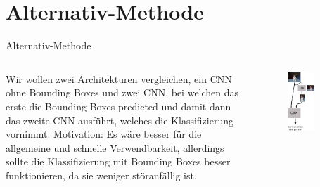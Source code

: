   \section{Alternativ-Methode}
  \begin{frame}{Alternativ-Methode}
    \begin{columns}[c]
      Wir wollen zwei Architekturen vergleichen, ein CNN ohne Bounding Boxes und zwei
      CNN, bei welchen das erste die Bounding Boxes predicted und damit dann das zweite
      CNN ausführt, welches die Klassifizierung vornimmt. Motivation: Es wäre besser
      für die allgemeine und schnelle Verwendbarkeit, allerdings sollte die Klassifizierung
      mit Bounding Boxes besser funktionieren, da sie weniger störanfällig ist.
      \begin{figure}
        \centering
        \includegraphics[width=0.6\textwidth]{logos/alternative_method.pdf}
      \end{figure}
    \end{columns}
  \end{frame}

